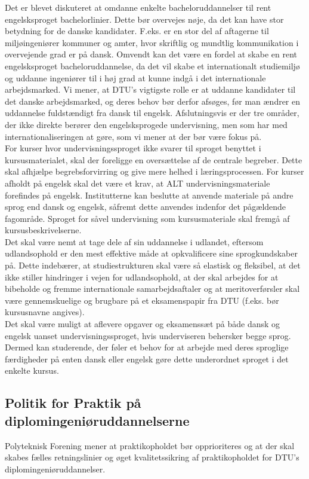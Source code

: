 Det er blevet diskuteret at omdanne enkelte bacheloruddannelser til rent engelsksproget bachelorlinier. Dette bør overvejes nøje, da det kan have stor betydning for de danske kandidater. F.eks. er en stor del af aftagerne til miljøingeniører kommuner og amter, hvor skriftlig og mundtlig kommunikation i overvejende grad er på dansk. Omvendt kan det være en fordel at skabe en rent engelsksproget bacheloruddannelse, da det vil skabe et internationalt studiemiljø og uddanne ingeniører til i høj grad at kunne indgå i det internationale arbejdsmarked. Vi mener, at DTU’s vigtigste rolle er at uddanne kandidater til det danske arbejdsmarked, og deres behov bør derfor afsøges, før man ændrer en uddannelse fuldstændigt fra dansk til engelsk. Afslutningsvis er der tre områder, der ikke direkte berører den engelsksprogede undervisning, men som har med internationaliseringen at gøre, som vi mener at der bør være fokus på. \\

For kurser hvor undervisningssproget ikke svarer til sproget benyttet i kursusmaterialet, skal der foreligge en oversættelse af de centrale begreber. Dette skal afhjælpe begrebsforvirring og give mere helhed i læringsprocessen. For kurser afholdt på engelsk skal det være et krav, at ALT undervisningsmateriale forefindes på engelsk. Institutterne kan beslutte at anvende materiale på andre sprog end dansk og engelsk, såfremt dette anvendes indenfor det pågældende fagområde. Sproget for såvel undervisning som kursusmateriale skal fremgå af kursusbeskrivelserne.\\

Det skal være nemt at tage dele af sin uddannelse i udlandet, eftersom udlandsophold er den mest effektive måde at opkvalificere sine sprogkundskaber på. Dette indebærer, at studiestrukturen skal være så elastisk og fleksibel, at det ikke stiller hindringer i vejen for udlandsophold, at der skal arbejdes for at bibeholde og fremme internationale samarbejdsaftaler og at meritoverførsler skal være gennemskuelige og brugbare på et eksamenspapir fra DTU (f.eks.
bør kursusnavne angives).\\

Det skal være muligt at aflevere opgaver og eksamenssæt på både dansk og engelsk uanset undervisningssproget, hvis underviseren behersker begge sprog. Dermed kan studerende, der føler et behov for at arbejde med deres sproglige færdigheder på enten dansk eller engelsk gøre dette underordnet sproget i det enkelte kursus.

\subsection{Politik for Praktik på diplomingeniøruddannelserne}
Polyteknisk Forening mener at praktikopholdet bør opprioriteres og at der skal skabes fælles retningslinier og øget kvalitetssikring af praktikopholdet for DTU’s diplomingeniøruddannelser.\\

